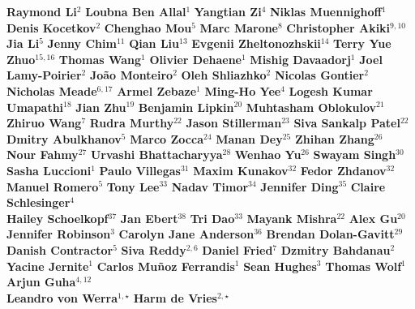 \begin{center}
\textbf{Raymond Li}$^2$\quad
\textbf{Loubna Ben Allal}$^1$\quad
\textbf{Yangtian Zi}$^4$\quad
\textbf{Niklas Muennighoff}$^1$\quad
\textbf{Denis Kocetkov}$^2$\quad
\textbf{Chenghao Mou}$^5$\quad
\textbf{Marc Marone}$^8$\quad
\textbf{Christopher Akiki}$^{9,10}$\quad
\textbf{Jia Li}$^5$\quad
\textbf{Jenny Chim}$^{11}$\quad
\textbf{Qian Liu}$^{13}$\quad
\textbf{Evgenii Zheltonozhskii}$^{14}$\quad
\textbf{Terry Yue Zhuo}$^{15,16}$\quad
\textbf{Thomas Wang}$^1$\quad
\textbf{Olivier Dehaene}$^1$\quad
\textbf{Mishig Davaadorj}$^1$\quad
\textbf{Joel Lamy-Poirier}$^2$\quad
\textbf{João Monteiro}$^2$\quad
\textbf{Oleh Shliazhko}$^2$\quad
\textbf{Nicolas Gontier}$^2$\quad
\textbf{Nicholas Meade}$^{6,17}$\quad
\textbf{Armel Zebaze}$^1$\quad
\textbf{Ming-Ho Yee}$^4$\quad
\textbf{Logesh Kumar Umapathi}$^{18}$\quad
\textbf{Jian Zhu}$^{19}$\quad
\textbf{Benjamin Lipkin}$^{20}$\quad
\textbf{Muhtasham Oblokulov}$^{21}$\quad
\textbf{Zhiruo Wang}$^7$\quad
\textbf{Rudra Murthy}$^{22}$\quad
\textbf{Jason Stillerman}$^{23}$\quad
\textbf{Siva Sankalp Patel}$^{22}$\quad
\textbf{Dmitry Abulkhanov}$^5$\quad
\textbf{Marco Zocca}$^{24}$\quad
\textbf{Manan Dey}$^{25}$\quad
\textbf{Zhihan Zhang}$^{26}$\quad
\textbf{Nour Fahmy}$^{27}$\quad
\textbf{Urvashi Bhattacharyya}$^{28}$\quad
\textbf{Wenhao Yu}$^{26}$\quad
\textbf{Swayam Singh}$^{30}$\quad
\textbf{Sasha Luccioni}$^1$\quad
\textbf{Paulo Villegas}$^{31}$\quad
\textbf{Maxim Kunakov}$^{32}$\quad
\textbf{Fedor Zhdanov}$^{32}$\quad
\textbf{Manuel Romero}$^5$\quad
\textbf{Tony Lee}$^{33}$\quad
\textbf{Nadav Timor}$^{34}$\quad
\textbf{Jennifer Ding}$^{35}$\quad
\textbf{Claire Schlesinger}$^{4}$\quad
\\\textbf{Hailey Schoelkopf}$^{37}$\quad
\textbf{Jan Ebert}$^{38}$\quad
\textbf{Tri Dao}$^{33}$\quad
\textbf{Mayank Mishra}$^{22}$\quad
\textbf{Alex Gu}$^{20}$\quad
\textbf{Jennifer Robinson}$^3$\quad
\textbf{Carolyn Jane Anderson}$^{36}$\quad
\textbf{Brendan Dolan-Gavitt}$^{29}$\quad
\textbf{Danish Contractor}$^5$\quad
\textbf{Siva Reddy}$^{2,6}$\quad
\textbf{Daniel Fried}$^7$\quad
\textbf{Dzmitry Bahdanau}$^2$\quad
\textbf{Yacine Jernite}$^1$\quad
\textbf{Carlos Muñoz Ferrandis}$^1$\quad 
\textbf{Sean Hughes}$^3$\quad
\textbf{Thomas Wolf}$^1$\quad
\textbf{Arjun Guha}$^{4,12}$\quad
\\\textbf{Leandro von Werra}$^{1, \star}$\quad
\textbf{Harm de Vries}$^{2, \star}$\quad


\end{center}
